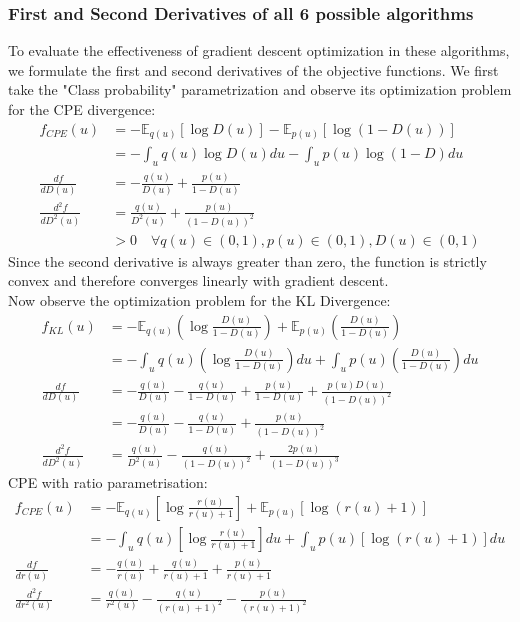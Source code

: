 \documentclass[a4paper,12pt]{article}
\newcommand{\E}{\mathbb{E}}
\numberwithin{equation}{section}
\begin{document}
\subsubsection{First and Second Derivatives of all 6 possible algorithms}
To evaluate the effectiveness of gradient descent optimization in these algorithms, we formulate the first and second derivatives of the objective functions. We first take the "Class probability" parametrization and observe its optimization problem for the CPE divergence:
\begin{align*}
f_{CPE}(u)&=-\E_{q(u)}[\log D(u)]-\E_{p(u)}[\log (1-D(u))]\\
&=-\int_u q(u)\log D(u) du -\int_u p(u)\log(1-D)du\\
\frac{df}{dD(u)}&=-\frac{q(u)}{D(u)}+\frac{p(u)}{1-D(u)}\\
\frac{d^2f}{dD^2(u)}&=\frac{q(u)}{D^2(u)}+\frac{p(u)}{(1-D(u))^2}\\
&>0 \quad \forall q(u)\in(0,1), p(u)\in (0,1), D(u)\in (0,1) 
\end{align*}
Since the second derivative is always greater than zero, the function is strictly convex and therefore converges linearly with gradient descent.\\
Now observe the optimization problem for the KL Divergence:
\begin{align*}
f_{KL}(u)&=-\E_{q(u)}\left(\log \frac{D(u)}{1-D(u)}\right)+\E_{p(u)}\left(\frac{D(u)}{1-D(u)}\right)\\
&=-\int_u q(u)\left(\log \frac{D(u)}{1-D(u)}\right)du+\int_u p(u)\left(\frac{D(u)}{1-D(u)}\right)du\\
\frac{df}{dD(u)}&=-\frac{q(u)}{D(u)}-\frac{q(u)}{1-D(u)}+\frac{p(u)}{1-D(u)}+\frac{p(u)D(u)}{(1-D(u))^2}\\
&=-\frac{q(u)}{D(u)}-\frac{q(u)}{1-D(u)}+\frac{p(u)}{(1-D(u))^2}\\
\frac{d^2f}{dD^2(u)}&=\frac{q(u)}{D^2(u)}-\frac{q(u)}{(1-D(u))^2}+\frac{2p(u)}{(1-D(u))^3}
\end{align*}
CPE with ratio parametrisation:
\begin{align*}
f_{CPE}(u)&=-\E_{q(u)}\left[\log \frac{r(u)}{r(u)+1}\right]+\E_{p(u)}\left[\log(r(u)+1)\right]\\
&=-\int_u q(u)\left[\log \frac{r(u)}{r(u)+1}\right]du+\int_u p(u)\left[\log(r(u)+1)\right]du\\
\frac{df}{dr(u)}&=-\frac{q(u)}{r(u)}+\frac{q(u)}{r(u)+1}+\frac{p(u)}{r(u)+1}\\
\frac{d^2f}{dr^2(u)}&=\frac{q(u)}{r^2(u)}-\frac{q(u)}{(r(u)+1)^2}-\frac{p(u)}{(r(u)+1)^2}
\end{align*}
\end{document}
